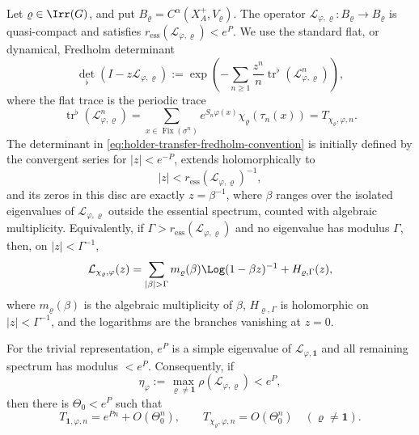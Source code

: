 \begin{lemma}
  \label{lem:holder-transfer-determinant-convention}
  Let \(\varrho\in\Irr(G)\), and put
  \(B_\varrho=C^\alpha(X_A^+,V_\varrho)\). The operator
  \(\mathscr L_{\varphi,\varrho}:B_\varrho\to B_\varrho\) is
  quasi-compact and satisfies
  \(r_{\mathrm{ess}}(\mathscr L_{\varphi,\varrho})<e^P\). We use the
  standard flat, or dynamical, Fredholm determinant
  \begin{equation}\label{eq:holder-transfer-fredholm-convention}
    \det_\flat(I-z\mathscr L_{\varphi,\varrho})
    :=
    \exp\!\left(
      -\sum_{n\ge 1}
        \frac{z^n}{n}
        \operatorname{tr}^{\flat}(\mathscr L_{\varphi,\varrho}^n)
    \right),
  \end{equation}
  where the flat trace is the periodic trace
  \begin{equation}\label{eq:holder-transfer-flat-trace}
    \operatorname{tr}^{\flat}(\mathscr L_{\varphi,\varrho}^n)
    =
    \sum_{x\in\operatorname{Fix}(\sigma^n)}
      e^{S_n\varphi(x)}\chi_\varrho(\tau_n(x))
    =
    T_{\chi_\varrho,\varphi,n}.
  \end{equation}
  The determinant in
  \eqref{eq:holder-transfer-fredholm-convention} is initially defined
  by the convergent series for \(|z|<e^{-P}\), extends holomorphically
  to
  \[
    |z|<r_{\mathrm{ess}}(\mathscr L_{\varphi,\varrho})^{-1},
  \]
  and its zeros in this disc are exactly
  \(z=\beta^{-1}\), where \(\beta\) ranges over the isolated
  eigenvalues of \(\mathscr L_{\varphi,\varrho}\) outside the essential
  spectrum, counted with algebraic multiplicity. Equivalently, if
  \(\Gamma>r_{\mathrm{ess}}(\mathscr L_{\varphi,\varrho})\) and no
  eigenvalue has modulus \(\Gamma\), then, on
  \(|z|<\Gamma^{-1}\),
  \begin{equation}\label{eq:holder-transfer-determinant-factor}
    \mathcal L_{\chi_\varrho,\varphi}(z)
    =
    \sum_{|\beta|>\Gamma}
      m_\varrho(\beta)\Log(1-\beta z)^{-1}
    +H_{\varrho,\Gamma}(z),
  \end{equation}
  where \(m_\varrho(\beta)\) is the algebraic multiplicity of
  \(\beta\), \(H_{\varrho,\Gamma}\) is holomorphic on
  \(|z|<\Gamma^{-1}\), and the logarithms are the branches vanishing at
  \(z=0\).

  For the trivial representation, \(e^P\) is a simple eigenvalue of
  \(\mathscr L_{\varphi,\mathbf 1}\) and all remaining spectrum has
  modulus \(<e^P\). Consequently, if
  \[
    \eta_\varphi
    :=
    \max_{\varrho\neq\mathbf 1}
      \rho(\mathscr L_{\varphi,\varrho})<e^P,
  \]
  then there is \(\Theta_0<e^P\) such that
  \begin{equation}\label{eq:holder-transfer-periodic-trace-gap}
    T_{\mathbf 1,\varphi,n}=e^{Pn}+O(\Theta_0^n),
    \qquad
    T_{\chi_\varrho,\varphi,n}=O(\Theta_0^n)
    \quad(\varrho\neq\mathbf 1).
  \end{equation}
\end{lemma}

